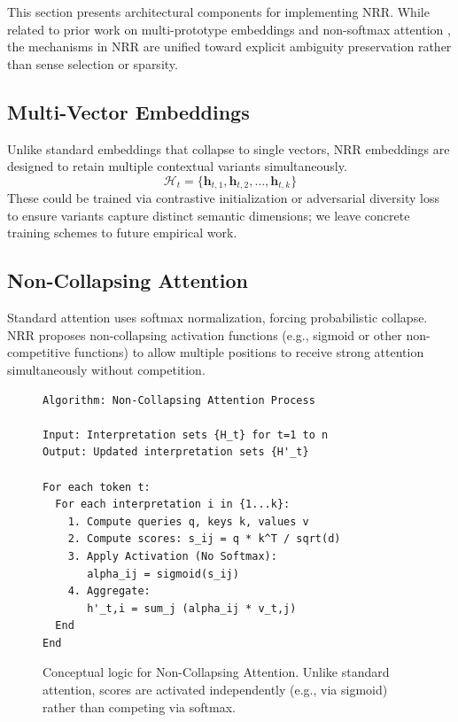 \documentclass[11pt,a4paper]{article}
\begin{document}
This section presents architectural components for implementing NRR.
While related to prior work on multi-prototype embeddings \cite{reisinger2010multi, levine2020sensebert, loureiro2022lmms} and non-softmax attention \cite{katharopoulos2020transformers, choromanski2021rethinking}, the mechanisms in NRR are unified toward explicit ambiguity preservation rather than sense selection or sparsity.

\subsection{Multi-Vector Embeddings}

Unlike standard embeddings that collapse to single vectors, NRR embeddings are designed to retain multiple contextual variants simultaneously.
\begin{equation}
\mathcal{H}_t = \{\mathbf{h}_{t,1}, \mathbf{h}_{t,2}, \ldots, \mathbf{h}_{t,k}\}
\end{equation}
These could be trained via contrastive initialization or adversarial diversity loss to ensure variants capture distinct semantic dimensions; we leave concrete training schemes to future empirical work.

\subsection{Non-Collapsing Attention}

Standard attention uses softmax normalization, forcing probabilistic collapse.
NRR proposes non-collapsing activation functions (e.g., sigmoid or other non-competitive functions) to allow multiple positions to receive strong attention simultaneously without competition.

\begin{figure}[ht]
\centering
\begin{verbatim}
Algorithm: Non-Collapsing Attention Process

Input: Interpretation sets {H_t} for t=1 to n
Output: Updated interpretation sets {H'_t}

For each token t:
  For each interpretation i in {1...k}:
    1. Compute queries q, keys k, values v
    2. Compute scores: s_ij = q * k^T / sqrt(d)
    3. Apply Activation (No Softmax):
       alpha_ij = sigmoid(s_ij)
    4. Aggregate:
       h'_t,i = sum_j (alpha_ij * v_t,j)
  End
End
\end{verbatim}
\caption{Conceptual logic for Non-Collapsing Attention.
Unlike standard attention, scores are activated independently (e.g., via sigmoid) rather than competing via softmax.}
\label{fig:attention_logic}
\end{figure}
\end{document}
